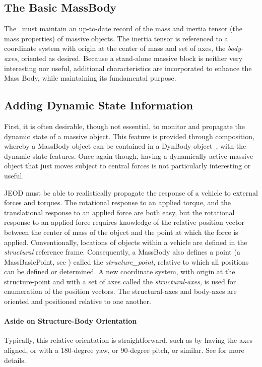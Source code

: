 \subsection{The Basic MassBody}
The \ModelDesc\ must maintain an up-to-date record of the mass and inertia
tensor (the mass properties) of massive objects.  The inertia tensor
is referenced to a coordinate system with origin at
the center of mass and set of axes, the \textit{body-axes}, oriented as
desired.
Because a stand-alone massive block
is neither very interesting nor useful, additional characteristics are
incorporated to enhance the Mass Body, while maintaining its fundamental
purpose.

\subsection{Adding Dynamic State Information}
First, it is often desirable, though not essential, to monitor and propagate
the
dynamic state of a massive object.  This feature is provided through
composition,
whereby a MassBody object can be contained in a DynBody object~\cite{dynenv:DYNBODY},
with the dynamic state features.
Once again though, having a dynamically active massive object that just moves
subject to central forces is not particularly interesting or useful.

JEOD must be able to realistically propagate the response of a vehicle to
external forces and torques. The rotational response to an applied torque, and
the translational response to an applied force are both easy, but the
rotational response to an applied force requires knowledge of the relative
position vector between the center of mass of the object and the point at
which
the force is applied.  Conventionally, locations of objects within a vehicle
are defined in the \textit{structural} reference frame.  Consequently, a
MassBody also defines a point
(a MassBasicPoint, see ) called the
\textit{structure\_point}, relative to which all
positions can be defined or determined.  A new coordinate system, with origin
at the structure-point and with a set of axes called the
\textit{structural-axes}, is used
for enumeration of the position vectors.  The structural-axes and body-axes
are oriented and positioned relative to one another.

\paragraph {Aside on Structure-Body Orientation}
Typically, this relative orientation is straightforward, such as by
having the axes aligned, or with a 180-degree yaw, or 90-degree pitch, or
similar. See  for
more details.

